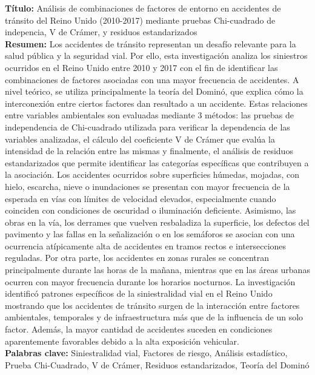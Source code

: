 \documentclass[12pt]{article}
\begin{document}
\textbf{Título:} Análisis de combinaciones de factores de entorno en accidentes de tránsito del Reino Unido (2010-2017) mediante pruebas Chi-cuadrado de indepencia, V de Crámer, y residuos estandarizados\\

\textbf{Resumen:} 
  Los accidentes de tránsito representan un desafío relevante para la salud pública 
  y la seguridad vial. Por ello, esta investigación analiza los siniestros ocurridos 
  en el Reino Unido entre 2010 y 2017 con el fin de identificar las combinaciones 
  de factores asociadas con una mayor frecuencia de accidentes. A nivel teórico, 
  se utiliza principalmente la teoría del Dominó, que explica cómo la interconexión 
  entre ciertos factores dan resultado a un accidente. Estas relaciones entre 
  variables ambientales son evaluadas mediante 3 métodos: las pruebas de independencia 
  de Chi-cuadrado utilizada para verificar la dependencia de las variables analizadas, 
  el cálculo del coeficiente V de Crámer que evalúa la intensidad de la relación
  entre las mismas y finalmente, el análisis de residuos estandarizados que permite 
  identificar las categorías específicas que contribuyen a la asociación. Los accidentes 
  ocurridos sobre superficies húmedas, mojadas, con hielo, escarcha, nieve o inundaciones 
  se presentan con mayor frecuencia de la esperada en vías con límites de velocidad 
  elevados, especialmente cuando coinciden con condiciones de oscuridad o iluminación 
  deficiente. Asimismo, las obras en la vía, los derrames que vuelven resbaladiza 
  la superficie, los defectos del pavimento y las fallas en la señalización o en 
  los semáforos se asocian con una ocurrencia atípicamente alta de accidentes en 
  tramos rectos e intersecciones reguladas. Por otra parte, los accidentes en zonas
  rurales se concentran principalmente durante las horas de la mañana, mientras que 
  en las áreas urbanas ocurren con mayor frecuencia durante los horarios nocturnos. 
  La investigación identificó patrones específicos de la siniestralidad vial en el
  Reino Unido mostrando que los accidentes de tránsito surgen de la interacción 
  entre factores ambientales, temporales y de infraestructura más que de la influencia 
  de un solo factor. Además, la mayor cantidad de accidentes suceden en condiciones 
  aparentemente favorables debido a la alta exposición vehicular. \\


\textbf{Palabras clave:} 
  Siniestralidad vial, Factores de riesgo, Análisis estadístico, 
  Prueba Chi-Cuadrado, V de Crámer, Residuos estandarizados, Teoría del Dominó \\
  
\end{document}
